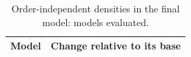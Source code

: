 \begin{table}[htbp]
\centering
\caption{Order-independent densities in the final model: models evaluated.}
\begin{tabular}{l p{}}
\toprule
Model & Change relative to its base \\
\midrule
\bottomrule
\end{tabular}
\label{tab:mi_density_revisited_variants}
\end{table}
